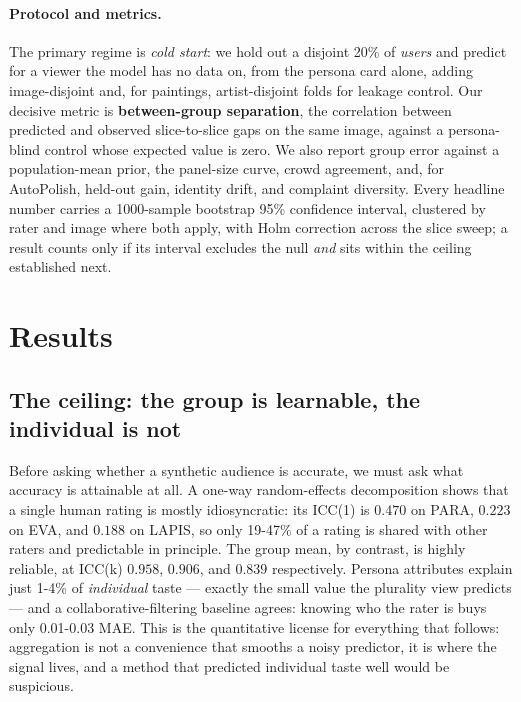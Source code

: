 \documentclass{article}
\begin{document}
\paragraph{Protocol and metrics.} The primary regime is \emph{cold start}: we hold out a disjoint 20\% of \emph{users} and predict for a viewer the model has no data on, from the persona card alone, adding image-disjoint and, for paintings, artist-disjoint folds for leakage control. Our decisive metric is \textbf{between-group separation}, the correlation between predicted and observed slice-to-slice gaps on the same image, against a persona-blind control whose expected value is zero. We also report group error against a population-mean prior, the panel-size curve, crowd agreement, and, for AutoPolish, held-out gain, identity drift, and complaint diversity. Every headline number carries a 1000-sample bootstrap 95\% confidence interval, clustered by rater and image where both apply, with Holm correction across the slice sweep; a result counts only if its interval excludes the null \emph{and} sits within the ceiling established next.


\section{Results}

\subsection{The ceiling: the group is learnable, the individual is not}
\label{sec:ceiling}

Before asking whether a synthetic audience is accurate, we must ask what accuracy is attainable at all. A one-way random-effects decomposition shows that a single human rating is mostly idiosyncratic: its ICC(1) is $0.470$ on PARA, $0.223$ on EVA, and $0.188$ on LAPIS, so only 19-47\% of a rating is shared with other raters and predictable in principle. The group mean, by contrast, is highly reliable, at ICC(k) $0.958$, $0.906$, and $0.839$ respectively. Persona attributes explain just 1-4\% of \emph{individual} taste --- exactly the small value the plurality view predicts --- and a collaborative-filtering baseline agrees: knowing who the rater is buys only 0.01-0.03 MAE. This is the quantitative license for everything that follows: aggregation is not a convenience that smooths a noisy predictor, it is where the signal lives, and a method that predicted individual taste well would be suspicious.
\end{document}
